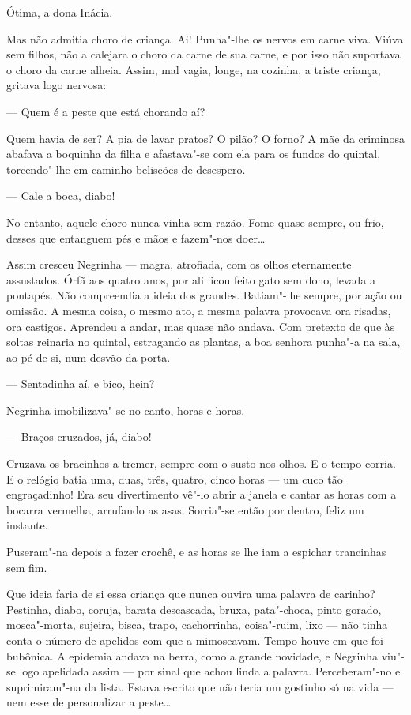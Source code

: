 Ótima, a dona Inácia.

Mas não admitia choro de criança. Ai! Punha"-lhe os nervos em carne viva.
Viúva sem filhos, não a calejara o choro da carne de sua carne, e por
isso não suportava o choro da carne alheia. Assim, mal vagia, longe, na
cozinha, a triste criança, gritava logo nervosa:

--- Quem é a peste que está chorando aí?

Quem havia de ser? A pia de lavar pratos? O pilão? O forno? A mãe da
criminosa abafava a boquinha da filha e afastava"-se com ela para os
fundos do quintal, torcendo"-lhe em caminho beliscões de desespero.

--- Cale a boca, diabo!

No entanto, aquele choro nunca vinha sem razão. Fome quase sempre, ou
frio, desses que entanguem pés e mãos e fazem"-nos doer\ldots{}

Assim cresceu Negrinha --- magra, atrofiada, com os olhos eternamente
assustados. Órfã aos quatro anos, por ali ficou feito gato sem dono,
levada a pontapés. Não compreendia a ideia dos grandes. Batiam"-lhe
sempre, por ação ou omissão. A mesma coisa, o mesmo ato, a mesma palavra
provocava ora risadas, ora castigos. Aprendeu a andar, mas quase não
andava. Com pretexto de que às soltas reinaria no quintal, estragando as
plantas, a boa senhora punha"-a na sala, ao pé de si, num desvão da
porta.

--- Sentadinha aí, e bico, hein?

Negrinha imobilizava"-se no canto, horas e horas.

--- Braços cruzados, já, diabo!

Cruzava os bracinhos a tremer, sempre com o susto nos olhos. E o tempo
corria. E o relógio batia uma, duas, três, quatro, cinco horas --- um
cuco tão engraçadinho! Era seu divertimento vê"-lo abrir a janela e
cantar as horas com a bocarra vermelha, arrufando as asas. Sorria"-se
então por dentro, feliz um instante.

Puseram"-na depois a fazer crochê, e as horas se lhe iam a espichar
trancinhas sem fim.

Que ideia faria de si essa criança que nunca ouvira uma palavra de
carinho? Pestinha, diabo, coruja, barata descascada, bruxa, pata"-choca,
pinto gorado, mosca"-morta, sujeira, bisca, trapo, cachorrinha,
coisa"-ruim, lixo --- não tinha conta o número de apelidos com que a
mimoseavam. Tempo houve em que foi bubônica. A epidemia andava na berra,
como a grande novidade, e Negrinha viu"-se logo apelidada assim --- por
sinal que achou linda a palavra. Perceberam"-no e suprimiram"-na da lista.
Estava escrito que não teria um gostinho só na vida --- nem esse de
personalizar a peste\ldots{}

